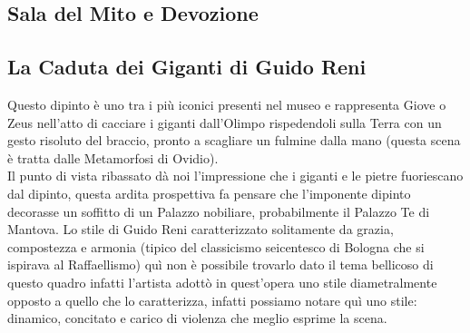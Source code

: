 \documentclass[hidelinks,12pt,a4paper]{article}
\begin{document}
\begin{flushleft}
		\section{Sala del Mito e Devozione}
		
		\subsection{La Caduta dei Giganti di Guido Reni}
		Questo dipinto è uno tra i più iconici presenti nel museo e rappresenta Giove o Zeus nell'atto di cacciare i giganti dall'Olimpo rispedendoli sulla Terra con un gesto risoluto del braccio, pronto a scagliare un fulmine dalla mano (questa scena è tratta dalle Metamorfosi di Ovidio).\\
		Il punto di vista ribassato dà noi l'impressione che i giganti e le pietre fuoriescano dal dipinto, questa ardita prospettiva fa pensare che l'imponente dipinto decorasse un soffitto di un Palazzo nobiliare, probabilmente il Palazzo Te di Mantova. Lo stile di Guido Reni caratterizzato solitamente da grazia, compostezza e armonia (tipico del classicismo seicentesco di Bologna che si ispirava al Raffaellismo) quì non è possibile trovarlo dato il tema bellicoso di questo quadro infatti l'artista adottò in quest'opera uno stile diametralmente opposto a quello che lo caratterizza, infatti possiamo notare quì uno stile: dinamico, concitato e carico di violenza che meglio esprime la scena.
		

\end{flushleft}
\end{document}
